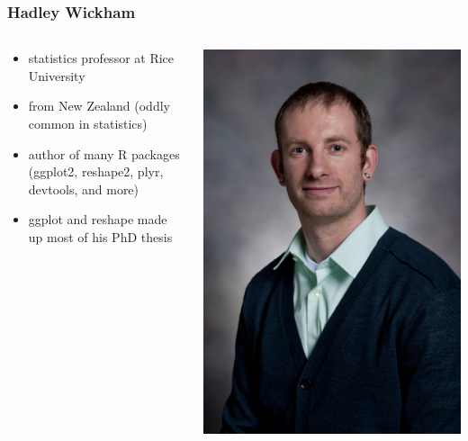 \documentclass{beamer}\usepackage{graphicx, color}
\begin{document}
\begin{frame}
  \frametitle{Hadley Wickham}

  \begin{columns}
    \begin{column}{0.5\textwidth}
      \begin{itemize}
        \item statistics professor at Rice University
        \item from New Zealand (oddly common in statistics)
        \item author of many R packages (ggplot2, reshape2, plyr, devtools, and more)
        \item ggplot and reshape made up most of his PhD thesis
      \end{itemize}
    \end{column}
    \begin{column}{0.5\textwidth}
      \includegraphics[width = \textwidth, keepaspectratio = true]{figure/hw}
    \end{column}
  \end{columns}

\end{frame}
\end{document}
